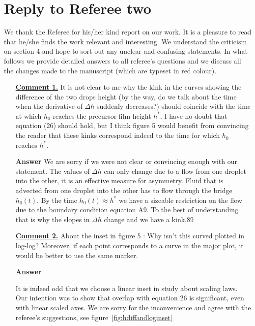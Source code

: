 \documentclass[12pt,english]{article}
\begin{document}

\section*{Reply to Referee two}

We thank the Referee for his/her kind report on our work. 
It is a pleasure to read that he/she finds the work relevant and interesting.
We understand the criticism on section 4 and hope to sort out any unclear and confusing statements. 
In what follows we provide detailed answers to all referee's questions and we discuss all the changes made to the manuscript
(which are typeset in red colour).

\begin{itemize}


\item[ \textbf{\underline{Comment 1.}}]
{
It is not clear to me why the kink in the curves showing the difference of the two drops height (by the way, do we talk about the time when the derivative of $\Delta h$ suddenly decreases?) should coincide with the time at which $h_0$ reaches the precursor film height $h^{\ast}$. 
I have no doubt that equation (26) should hold, but I think figure 5 would benefit from convincing the reader that these kinks correspond indeed to the time for which $h_0$ reaches $h^{\ast}$.
}

\item[ \textbf{Answer}]
{
We are sorry if we were not clear or convincing enough with our statement.
The values of $\Delta h$ can only change due to a flow from one droplet into the other, it is an effective measure for asymmetry.
Fluid that is advected from one droplet into the other has to flow through the bridge $h_0(t)$.
By the time $h_0(t)\approx h^{\ast}$ we have a sizeable restriction on the flow due to the boundary condition equation A9. 
To the best of understanding that is why the slopes in $\Delta h$ change and we have a kink.89
}

\item[ \textbf{\underline{Comment 2.}}]
{
About the inset in figure 5 : Why isn't this curved plotted in log-log?
Moreover, if each point corresponds to a curve in the major plot, it would be better to use the same marker.
}

\item[ \textbf{Answer}]
{
It is indeed odd that we choose a linear inset in study about scaling laws.
Our intention was to show that overlap with equation 26 is significant, even with linear scaled axes.
We are sorry for the inconvenience and agree with the referee's suggestions, see figure~\ref{fig:hdiffandloginset}

}
\end{itemize}
\end{document}
